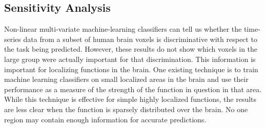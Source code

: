 \documentclass[preprint,5p,authoryear]{elsarticle}
\begin{document}
\subsection{Sensitivity Analysis}
Non-linear multi-variate machine-learning classifiers can tell us whether the time-series data from a subset of human brain voxels is discriminative with respect to the task being predicted. 
However, these results do not show which voxels in the large group were actually important for that discrimination.
This information is important for localizing functions in the brain.
One existing technique is to train machine learning classifiers on small localized areas in the brain and use their performance as a measure of the strength of the function in question in that area.
While this technique is effective for simple highly localized functions, the results are less clear when the function is sparsely distributed over the brain.
No one region may contain enough information for accurate predictions.
\end{document}
